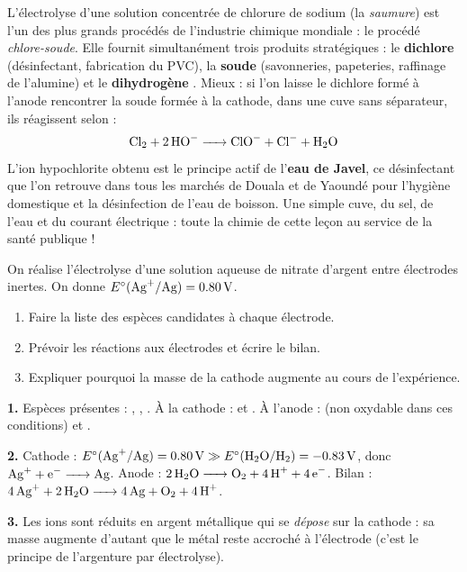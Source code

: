 \documentclass[11pt]{article}
\begin{document}
\begin{savaistu}
L'électrolyse d'une solution concentrée de chlorure de sodium (la \emph{saumure}) est l'un des plus grands procédés de l'industrie chimique mondiale : le procédé \emph{chlore-soude}. Elle fournit simultanément trois produits stratégiques : le \textbf{dichlore}  (désinfectant, fabrication du PVC), la \textbf{soude}  (savonneries, papeteries, raffinage de l'alumine) et le \textbf{dihydrogène} . Mieux : si l'on laisse le dichlore formé à l'anode rencontrer la soude formée à la cathode, dans une cuve sans séparateur, ils réagissent selon :
\[ \ce{Cl2 + 2 HO- -> ClO- + Cl- + H2O} \]
L'ion hypochlorite  obtenu est le principe actif de l'\textbf{eau de Javel}, ce désinfectant que l'on retrouve dans tous les marchés de Douala et de Yaoundé pour l'hygiène domestique et la désinfection de l'eau de boisson. Une simple cuve, du sel, de l'eau et du courant électrique : toute la chimie de cette leçon au service de la santé publique !
\end{savaistu}

\begin{exercice}
On réalise l'électrolyse d'une solution aqueuse de nitrate d'argent  entre électrodes inertes. On donne $E^{\circ}(\ce{Ag+}/\ce{Ag}) = \SI{+0,80}{V}$.
\begin{enumerate}
\item Faire la liste des espèces candidates à chaque électrode.
\item Prévoir les réactions aux électrodes et écrire le bilan.
\item Expliquer pourquoi la masse de la cathode augmente au cours de l'expérience.
\end{enumerate}
\end{exercice}

\begin{corrige}[Exercice]
\textbf{1.} Espèces présentes : , , . À la cathode :  et . À l'anode :  (non oxydable dans ces conditions) et .

\textbf{2.} Cathode : $E^{\circ}(\ce{Ag+}/\ce{Ag}) = \SI{+0,80}{V} \gg E^{\circ}(\ce{H2O}/\ce{H2}) = \SI{-0,83}{V}$, donc $\ce{Ag+ + e- -> Ag}$. Anode : $\ce{2 H2O -> O2 + 4 H+ + 4 e-}$. Bilan : $\ce{4 Ag+ + 2 H2O -> 4 Ag + O2 + 4 H+}$.

\textbf{3.} Les ions  sont réduits en argent métallique qui se \emph{dépose} sur la cathode : sa masse augmente d'autant que le métal reste accroché à l'électrode (c'est le principe de l'argenture par électrolyse).
\end{corrige}
\end{document}
